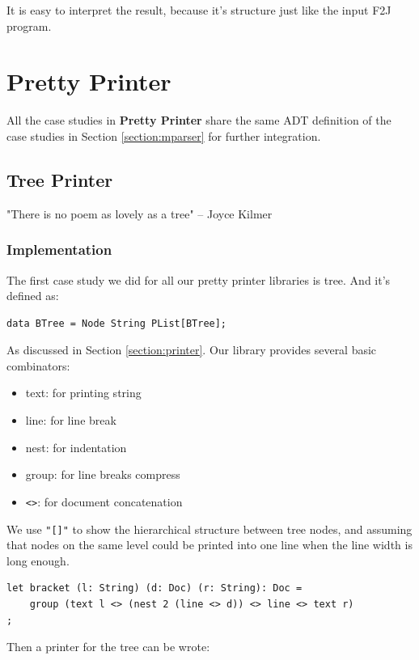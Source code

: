 It is easy to interpret the result, because it's structure just like the input F2J program.

\section{Pretty Printer}

All the case studies in \textbf{Pretty Printer} share the same ADT definition of the case studies in Section \ref{section:mparser} for further integration.

\subsection{Tree Printer}

"There is no poem as lovely as a tree" -- Joyce Kilmer

\subsubsection{Implementation}

The first case study we did for all our pretty printer libraries is tree. And it's defined as:

\begin{lstlisting}
data BTree = Node String PList[BTree];
\end{lstlisting}

As discussed in Section \ref{section:printer}. Our library provides several basic combinators:

\begin{itemize}
\item text:    for printing string
\item line:    for line break
\item nest:    for indentation
\item group:   for line breaks compress
\item \texttt{<>}:      for document concatenation
\end{itemize}

We use \texttt{"[]"} to show the hierarchical structure between tree nodes, and assuming that nodes on the same level could be printed into one line when the line width is long enough.
\begin{lstlisting}
let bracket (l: String) (d: Doc) (r: String): Doc =
    group (text l <> (nest 2 (line <> d)) <> line <> text r)
;
\end{lstlisting}

Then a printer for the tree can be wrote:

